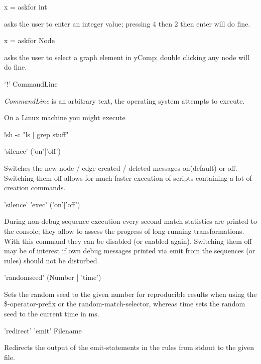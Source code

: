 \begin{example}
\begin{grshelllet}
x = askfor int
\end{grshelllet}
asks the user to enter an integer value; pressing 4 then 2 then enter will do fine.
\begin{grshelllet}
x = askfor Node
\end{grshelllet}
asks the user to select a graph element in yComp; double clicking any node will do fine.
\end{example}

\begin{rail}
  '!' CommandLine
\end{rail}
\emph{CommandLine} is an arbitrary text, the operating system attempts to execute.
\begin{example}
On a Linux machine you might execute
\begin{grshell}
!sh -c "ls | grep stuff"
\end{grshell}
\end{example}

\begin{rail}
'silence' ('on'|'off')
\end{rail}
Switches the new node / edge created / deleted messages on(default) or off.
Switching them off allows for much faster execution of scripts containing a lot of creation commands.

\begin{rail}
'silence' 'exec' ('on'|'off')
\end{rail}
During non-debug sequence execution every second match statistics are printed to the console;
they allow to assess the progress of long-running transformations.
With this command they can be disabled (or enabled again).
Switching them off may be of interest if own debug messages printed via emit from the sequences (or rules) should not be disturbed.

\begin{rail}
'randomseed' (Number | 'time')
\end{rail}
Sets the random seed to the given number for reproducible results when using the \$-operator-prefix or the random-match-selector, whereas time sets the random seed to the current time in ms.

\begin{rail}
'redirect' 'emit' Filename
\end{rail}
Redirects the output of the emit-statements in the rules from stdout to the given file.

